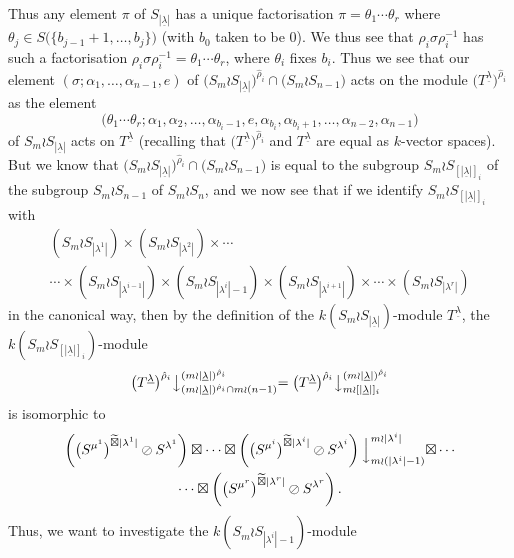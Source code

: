 \documentclass[10pt]{article}
\theoremstyle{definition}
\newcommand{\ul}[1]{\underline{#1}}
\begin{document}
Thus any element $\pi$ of $S_{|\ul{\lambda}|}$ has a unique factorisation $\pi = \theta_1\cdots\theta_r$ where
$\theta_j \in S\bigl(\{b_{j-1}+1,\ldots,b_j\}\bigr)$ (with $b_0$ taken to be 0). We thus see that $\rho_i\sigma\rho_i^{-1}$ has such a
factorisation $\rho_i\sigma\rho_i^{-1} = \theta_1\cdots\theta_r$, where $\theta_i$ fixes $b_i$. 
Thus we see that our element
$(\sigma;\alpha_1,\ldots,\alpha_{n-1},e)$ of $\bigl(S_m \wr S_{|\ul{\lambda}|}\bigr)^{\hat\rho_i}\cap\bigl(S_m \wr S_{n-1}\bigr)$ acts on the
module $\bigl(T^{\ul{\lambda}}\bigr)^{\hat\rho_i}$ as the element
\[
\bigl(\theta_1\cdots\theta_r;\alpha_1,\alpha_2,\ldots,\alpha_{b_i-1},e,\alpha_{b_i},\alpha_{b_i+1},\ldots,\alpha_{n-2},\alpha_{n-1}\bigr)
\]
of $S_m \wr S_{|\ul{\lambda}|}$ acts on $T^{\ul{\lambda}}$ (recalling that $\bigl(T^{\ul{\lambda}}\bigr)^{\hat\rho_i}$ and $T^{\ul{\lambda}}$ are equal
as $k$-vector spaces). But we know that $\bigl(S_m \wr S_{|\ul{\lambda}|}\bigr)^{\hat\rho_i}\cap\bigl(S_m \wr S_{n-1}\bigr)$ is equal to the
subgroup $S_m \wr S_{[|\ul{\lambda}|]_i}$ of the subgroup $S_m \wr S_{n-1}$ of $S_m \wr S_n$, and we now see that if we identify
$S_m \wr S_{[|\ul{\lambda}|]_i}$ with
\begin{multline*}
(S_m \wr S_{|\lambda^1|})\times(S_m \wr S_{|\lambda^2|})\times\cdots\\
\cdots\times
(S_m \wr S_{|\lambda^{i-1}|})\times(S_m \wr S_{|\lambda^i|-1})\times(S_m \wr S_{|\lambda^{i+1}|})\times\cdots\times
(S_m \wr S_{|\lambda^r|})
\end{multline*}
in the canonical way, then by the definition of the $k(S_m \wr S_{|\ul{\lambda}|})$-module $T^{\ul{\lambda}}$, the
$k(S_m \wr S_{[|\ul{\lambda}|]_i})$-module
\[
\bigl(T^{\ul{\lambda}}\bigr)^{\hat\rho_i}\bigl\downarrow^{(m{\wr}|\ul{\lambda}|)^{\hat\rho_i}}_{(m{\wr}|\ul{\lambda}|)^{\hat\rho_i} \cap m \wr (n-1)}
=
\bigl(T^{\ul{\lambda}}\bigr)^{\hat\rho_i}\bigl\downarrow^{(m{\wr}|\ul{\lambda}|)^{\hat\rho_i}}_{m \wr [|\ul{\lambda}|]_i}
\]
is isomorphic to
\begin{multline}\label{T_ul_lambd_isom_in_place_res:eq}
\left(\bigl(S^{\mu^1}\bigr)^{\widetilde\boxtimes |\lambda^1|}\oslash S^{\lambda^1}\right)\boxtimes\cdots\boxtimes
\left(\bigl(S^{\mu^i}\bigr)^{\widetilde\boxtimes |\lambda^i|}\oslash S^{\lambda^i}\right)\Bigl\downarrow^{m \wr |\lambda^i|}_{m \wr (|\lambda^i|-1)}
\boxtimes\cdots\\
\cdots\boxtimes
\left(\bigl(S^{\mu^r}\bigr)^{\widetilde\boxtimes |\lambda^r|}\oslash S^{\lambda^r}\right).
\end{multline}
Thus, we want to investigate the $k(S_m \wr S_{|\lambda^i|-1})$-module
\end{document}

